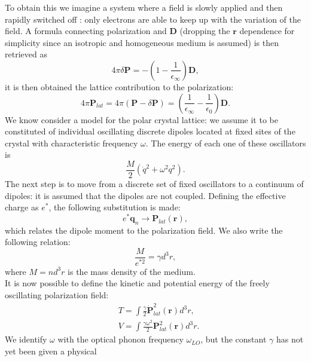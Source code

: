To obtain this we imagine a system where a field is slowly applied and then rapidly switched off \cite{haken1976quantum}: only 
electrons are able to keep up with the variation of the field. A formula connecting polarization and $\mathbf{D}$ (dropping the $\mathbf{r}$ dependence for simplicity 
since an isotropic and homogeneous medium is assumed) is then retrieved as
\begin{equation}
    4\pi \delta \mathbf{P} = -\left(1-\frac{1}{\epsilon_\infty}\right)\mathbf{D},
\end{equation}
it is then obtained the lattice contribution to the polarization:
\begin{equation}
    4\pi \mathbf{P}_{lat} = 4\pi(\mathbf{P}-\delta \mathbf{P}) = \left(\frac{1}{\epsilon_\infty}-\frac{1}{\epsilon_0}\right)\mathbf{D}.
    \label{eq_polarization_lattice}
\end{equation}
We know consider a model for the polar crystal lattice: we assume it to be constituted of individual oscillating discrete dipoles 
located at fixed sites of the crystal with characteristic frequency $\omega$. The energy of each one of these oscillators is 
\begin{equation}
    \frac{M}{2}(\dot{q}^2+\omega^2q^2).
\end{equation}
The next step is to move from a discrete set of fixed oscillators to a continuum of dipoles: it is assumed that the dipoles are not 
coupled. Defining the effective charge as $e^*$, the following substitution is made:
\begin{equation}
    e^*\mathbf{q}_n\to \mathbf{P}_{lat}(\mathbf{r}),
\end{equation}
which relates the dipole moment to the polarization field. We also write the following relation:
\begin{equation}
    \frac{M}{e^{*2}}=\gamma d^3r,
\end{equation}
where $M=nd^3r$ is the mass density of the medium.\\
It is now possible to define the kinetic and potential energy of the freely oscillating polarization field:
\begin{equation}
\begin{split}
    &T=\int \frac{\gamma}{2}\dot{\mathbf{P}}_{lat}^2(\mathbf{r})d^3r,\\
    &V=\int \frac{\gamma\omega^2}{2}\mathbf{P}_{lat}^2(\mathbf{r})d^3r.
\end{split}
\end{equation}
We identify $\omega$ with the optical phonon frequency $\omega_{LO}$, but the constant $\gamma$ has not yet been given a physical 
